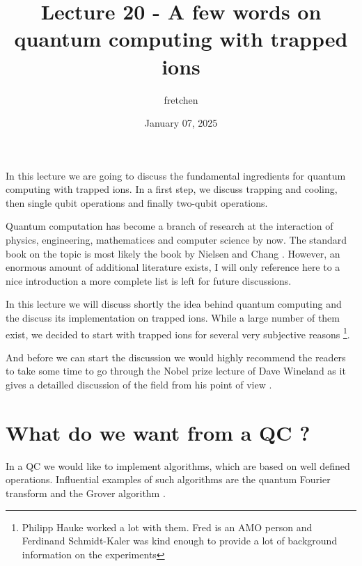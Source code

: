 \documentclass[10pt]{article}
\let\cite\citep
\renewenvironment{abstract}
  {{\bfseries\noindent{\abstractname}\par\nobreak}\footnotesize}
  {\bigskip}
\providecommand\citep{\cite}
\begin{document}
\title{Lecture 20 - A few words on quantum computing with trapped ions}



\author[1]{fretchen}%
%


\vspace{-1em}



  
  \date{January 07, 2025}


\begingroup
\let\center\flushleft
\let\endcenter\endflushleft
\maketitle
\endgroup





\begin{abstract}
In this lecture we are going to discuss the fundamental ingredients for quantum computing with trapped ions. In a first step, we discuss trapping and cooling, then single qubit operations and finally two-qubit operations.%
\end{abstract}%



\sloppy


Quantum computation has become a branch of research at the interaction of physics, engineering, mathematices and computer science by now. The standard book on the topic is most likely the book by Nielsen and Chang \cite{Nielsen_2009}. However, an enormous amount of additional literature exists, I will only reference here to a nice introduction \cite{beginners} a more complete list is left for future discussions.


In this lecture we will discuss shortly the idea behind quantum computing and the discuss its implementation on trapped ions. While a large number of them exist, we decided to start with trapped ions for several very subjective reasons \footnote{Philipp Hauke worked a lot with them. Fred is an AMO person and Ferdinand Schmidt-Kaler was kind enough to provide a lot of background information on the experiments}.

And before we can start the discussion we would highly recommend the readers to take some time to go through the Nobel prize lecture of Dave Wineland as it gives a detailled discussion of the field from his point of view \cite{Wineland_2013}.

\section{What do we want from a QC ?}
In a QC we would like to implement algorithms, which are based on well defined operations. Influential examples of such algorithms are the quantum Fourier transform and the Grover algorithm \cite{beginners}. 
\end{document}
